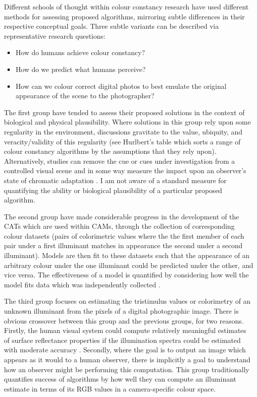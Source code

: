 Different schools of thought within colour constancy research have used different methods for assessing proposed algorithms, mirroring subtle differences in their respective conceptual goals. Three subtle variants can be described via representative research questions:

\begin{itemize}
\item{How do humans achieve colour constancy?}
\item{How do we predict what humans perceive?}
\item{How can we colour correct digital photos to best emulate the original appearance of the scene to the photographer?}
\end{itemize}

The first group have tended to assess their proposed solutions in the context of biological and physical plausibility. Where solutions in this group rely upon some regularity in the environment, discussions gravitate to the value, ubiquity, and veracity/validity of this regularity (see Hurlbert's table \cite[p.~295]{hurlbert_computational_1998} which sorts a range of colour constancy algorithms by the assumptions that they rely upon). Alternatively, studies can remove the cue or cues under investigation from a controlled visual scene and in some way measure the impact upon an observer's state of chromatic adaptation \cite{kraft_mechanisms_1999}. I am not aware of a standard measure for quantifying the ability or biological plausibility of a particular proposed algorithm.

The second group have made considerable progress in the development of the \Glspl{CAT} which are used within \Glspl{CAM}, through the collection of corresponding colour datasets (pairs of colorimetric values where the the first member of each pair under a first illuminant matches in appearance the second under a second illuminant). Models are then fit to these datasets such that the appearance of an arbitrary colour under the one illuminant could be predicted under the other, and vice versa. The effectiveness of a model is quantified by considering how well the model fits data which was independently collected \cite{cie_cie_2004-1}.

The third group focuses on estimating the tristimulus values or colorimetry of an unknown illuminant from the pixels of a digital photographic image. There is obvious crossover between this group and the previous groups, for two reasons.
Firstly, the human visual system could compute relatively meaningful estimates of surface reflectance properties if the illumination spectra could be estimated with moderate accuracy \cite{maloney_computational_1984}. Secondly, where the goal is to output an image which appears as it would to a human observer, there is implicitly a goal to understand how an observer might be performing this computation. This group traditionally quantifies success of algorithms by how well they can compute an illuminant estimate in terms of its RGB values in a camera-specific colour space.

